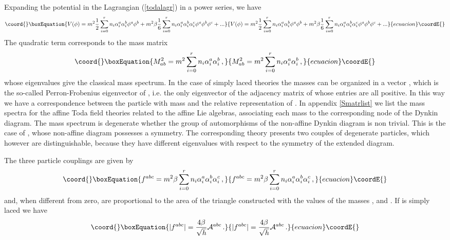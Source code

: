 \documentclass[a4paper,12pt]{report}
\begin{document}
Expanding the potential in the Lagrangian (\ref{todalagr}) in a power series, we have
\begin{equation}\coord{}\boxEquation{
V(\phi)=m^{2}\frac{1}{2}\sum_{i=0}^{r}n_{i}\alpha_{i}^{a}\alpha_{i}^{b}\phi^{a}\phi^{b}+m^{2}\beta\frac{1}{6}\sum_{i=0}^{r}n_{i}\alpha_{i}^{a}\alpha_{i}^{b}\alpha_{i}^{c}\phi^{a}\phi^{b}\phi^{c}+...
}{
V(\phi)=m^{2}\frac{1}{2}\sum_{i=0}^{r}n_{i}\alpha_{i}^{a}\alpha_{i}^{b}\phi^{a}\phi^{b}+m^{2}\beta\frac{1}{6}\sum_{i=0}^{r}n_{i}\alpha_{i}^{a}\alpha_{i}^{b}\alpha_{i}^{c}\phi^{a}\phi^{b}\phi^{c}+...
}{ecuacion}\coordE{}\end{equation}
The quadratic term corresponds to the mass matrix
\begin{equation}\coord{}\boxEquation{
M_{ab}^{2}=m^{2}\sum_{i=0}^{r}n_{i}\alpha_{i}^{a}\alpha_{i}^{b}\,,
}{
M_{ab}^{2}=m^{2}\sum_{i=0}^{r}n_{i}\alpha_{i}^{a}\alpha_{i}^{b}\,,
}{ecuacion}\coordE{}\end{equation}
whose eigenvalues \coordHE{} give the classical mass spectrum. In the case of simply laced
theories the masses can be organized in a vector \coordHE{}, which is the so-called Perron-Frobenius
eigenvector of \coordHE{}, i.e. the only eigenvector of the adjacency matrix of \coordHE{} whose entries are all positive. In
this way we have a correspondence between the particle with mass \coordHE{} and the relative representation of \coordHE{}.
In appendix \ref{Smatrlist} we list the mass spectra for the affine Toda field theories related to the \coordHE{}
affine Lie algebras, associating each mass to the corresponding node of the Dynkin diagram. The mass spectrum is
degenerate whether the group of automorphisms of the non-affine Dynkin diagram is non trivial. This is the case of
\coordHE{}, whose non-affine diagram possesses a \coordHE{} symmetry. The corresponding theory presents two couples of
degenerate particles, which however are distinguishable, because they have different eigenvalues with respect to
the \coordHE{} symmetry of the extended diagram.

The three particle couplings are given by
\begin{equation}\coord{}\boxEquation{
f^{abc}=m^{2}\beta\sum_{i=0}^{r}n_{i}\alpha_{i}^{a}\alpha_{i}^{b}\alpha_{i}^{c}\,,
}{
f^{abc}=m^{2}\beta\sum_{i=0}^{r}n_{i}\alpha_{i}^{a}\alpha_{i}^{b}\alpha_{i}^{c}\,,
}{ecuacion}\coordE{}\end{equation}
and, when different from zero, are proportional to the area \coordHE{} of the triangle constructed with the
values of the masses \coordHE{}, \coordHE{} and \coordHE{}. If \coordHE{} is simply laced we have
\begin{equation}\coord{}\boxEquation{
|f^{abc}|=\frac{4\beta}{\sqrt{h}}{\cal A}^{abc}\,.
}{
|f^{abc}|=\frac{4\beta}{\sqrt{h}}{\cal A}^{abc}\,.
}{ecuacion}\coordE{}\end{equation}
\end{document}
